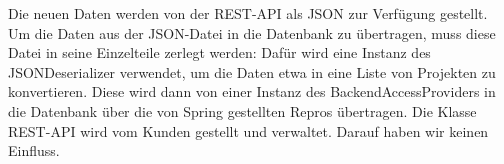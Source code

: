 \noindent
Die neuen Daten werden von der REST-API als JSON zur Verfügung gestellt. Um die Daten aus der JSON-Datei in die Datenbank zu übertragen, muss  diese Datei in seine Einzelteile zerlegt werden: Dafür wird eine Instanz des JSONDeserializer verwendet, um die Daten etwa in eine Liste von Projekten zu konvertieren. Diese wird dann von einer Instanz des BackendAccessProviders in die Datenbank über die von Spring gestellten Repros übertragen.
Die Klasse REST-API wird vom Kunden gestellt und verwaltet. Darauf haben wir keinen Einfluss.
